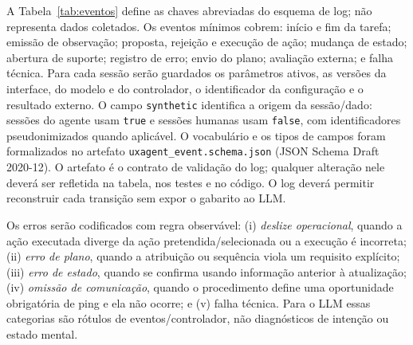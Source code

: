 \documentclass[conference]{IEEEtran}
\begin{document}
A Tabela~\ref{tab:eventos} define as chaves abreviadas do esquema de log; não representa dados coletados. Os eventos mínimos cobrem: início e fim da tarefa; emissão de observação; proposta, rejeição e execução de ação; mudança de estado; abertura de suporte; registro de erro; envio do plano; avaliação externa; e falha técnica. Para cada sessão serão guardados os parâmetros ativos, as versões da interface, do modelo e do controlador, o identificador da configuração e o resultado externo. O campo \texttt{synthetic} identifica a origem da sessão/dado: sessões do agente usam \texttt{true} e sessões humanas usam \texttt{false}, com identificadores pseudonimizados quando aplicável. O vocabulário e os tipos de campos foram formalizados no artefato \texttt{uxagent\_event.schema.json} (JSON Schema Draft 2020-12). O artefato é o contrato de validação do log; qualquer alteração nele deverá ser refletida na tabela, nos testes e no código. O log deverá permitir reconstruir cada transição sem expor o gabarito ao LLM. 

Os erros serão codificados com regra observável: (i) \textit{deslize operacional}, quando a ação executada diverge da ação pretendida/selecionada ou a execução é incorreta; (ii) \textit{erro de plano}, quando a atribuição ou sequência viola um requisito explícito; (iii) \textit{erro de estado}, quando se confirma usando informação anterior à atualização; (iv) \textit{omissão de comunicação}, quando o procedimento define uma oportunidade obrigatória de ping e ela não ocorre; e (v) falha técnica. Para o LLM essas categorias são rótulos de eventos/controlador, não diagnósticos de intenção ou estado mental.
\end{document}
